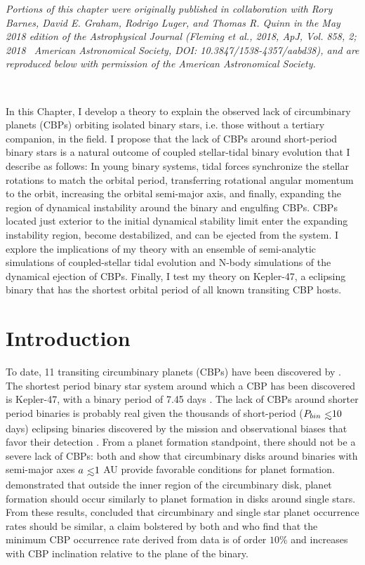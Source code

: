 \textit{Portions of this chapter were originally published in collaboration with Rory Barnes, David E. Graham, Rodrigo Luger, and Thomas R. Quinn in the May 2018 edition of the Astrophysical Journal (Fleming et al., 2018, ApJ, Vol. 858, 2; 2018 \textcopyright \ American Astronomical Society, DOI: 10.3847/1538-4357/aabd38), and are reproduced below with permission of the American Astronomical Society.}

\

In this Chapter, I develop a theory to explain the observed lack of circumbinary planets (CBPs) orbiting isolated binary stars, i.e. those without a tertiary companion, in the \kepler field. I propose that the lack of CBPs around short-period binary stars is a natural outcome of coupled stellar-tidal binary evolution that I describe as follows:  In young binary systems, tidal forces synchronize the stellar rotations to match the orbital period, transferring rotational angular momentum to the orbit, increasing the orbital semi-major axis, and finally, expanding the region of dynamical instability around the binary and engulfing CBPs.  CBPs located just exterior to the initial dynamical stability limit enter the expanding instability region, become destabilized, and can be ejected from the system.  I explore the implications of my theory with an ensemble of semi-analytic simulations of coupled-stellar tidal evolution and N-body simulations of the dynamical ejection of CBPs. Finally, I test my theory on Kepler-47, a \kepler eclipsing binary that has the shortest orbital period of all known transiting CBP hosts.


\section{Introduction} \label{STEEP:sec:intro}

To date, 11 transiting circumbinary planets (CBPs) have been discovered by \kepler.  The shortest period binary star system around which a CBP has been discovered is Kepler-47, with a binary period of 7.45 days \citep{Orosz2012}.  The lack of CBPs around shorter period binaries is probably real given the thousands of short-period ($P_{bin} \lsim 10$ days) eclipsing binaries discovered by the \kepler mission \citep{Kirk2016} and observational biases that favor their detection \citep{Munoz2015}.  From a planet formation standpoint, there should not be a severe lack of CBPs: both \citet{Alexander2012} and \citet{Vartanyan2016} show that circumbinary disks around binaries with semi-major axes $a \lsim 1$ AU provide favorable conditions for planet formation. \citet{Bromley2015} demonstrated that outside the inner region of the circumbinary disk, planet formation should occur similarly to planet formation in disks around single stars.  From these results, \citet{Bromley2015} concluded that circumbinary and single star planet occurrence rates should be similar, a claim bolstered by both \citet{Martin2014} and \citet{Armstrong2014} who find that the minimum CBP occurrence rate derived from \kepler data is of order $10\%$ and increases with CBP inclination relative to the plane of the binary.  

